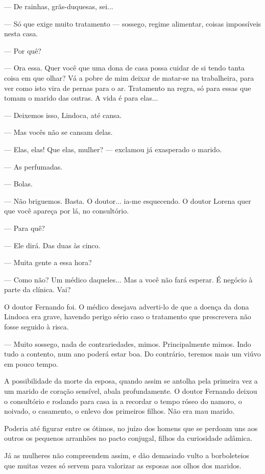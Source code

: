 --- De rainhas, grãs-duquesas, sei...

--- Só que exige muito tratamento --- sossego, regime alimentar, coisas
impossíveis nesta casa.

--- Por quê?

--- Ora essa. Quer você que uma dona de casa possa cuidar de si tendo
tanta coisa em que olhar? Vá a pobre de mim deixar de matar-se na
trabalheira, para ver como isto vira de pernas para o ar. Tratamento na
regra, só para essas que tomam o marido das outras. A vida é para
elas...

--- Deixemos isso, Lindoca, até cansa.

--- Mas vocês não se cansam delas.

--- Elas, elas! Que elas, mulher? --- exclamou já exasperado o marido.

--- As perfumadas.

--- Bolas.

--- Não briguemos. Basta. O doutor... ia-me esquecendo. O doutor Lorena
quer que você apareça por lá, no consultório.

--- Para quê?

--- Ele dirá. Das duas às cinco.

--- Muita gente a essa hora?

--- Como não? Um médico daqueles... Mas a você não fará esperar. É
negócio à parte da clínica. Vai?

O doutor Fernando foi. O médico desejava adverti-lo de que a doença da
dona Lindoca era grave, havendo perigo sério caso o tratamento que
prescrevera não fosse seguido à risca.

--- Muito sossego, nada de contrariedades, mimos. Principalmente mimos.
Indo tudo a contento, num ano poderá estar boa. Do contrário, teremos
mais um viúvo em pouco tempo.

A possibilidade da morte da esposa, quando assim se antolha pela
primeira vez a um marido de coração sensível, abala profundamente. O
doutor Fernando deixou o consultório e rodando para casa ia a recordar o
tempo róseo do namoro, o noivado, o casamento, o enlevo dos primeiros
filhos. Não era mau marido.

Poderia até figurar entre os ótimos, no juízo dos homens que se perdoam
uns aos outros os pequenos arranhões no pacto conjugal, filhos da
curiosidade adâmica.

Já as mulheres não compreendem assim, e dão demasiado vulto a
borboleteios que muitas vezes só servem para valorizar as esposas aos
olhos dos maridos.

